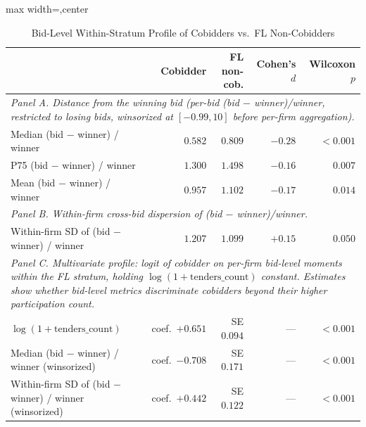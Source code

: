 \begin{table}[htbp]
\centering
\caption{Bid-Level Within-Stratum Profile of Cobidders vs.\ FL Non-Cobidders}
\label{tab:theory_bridge_bidlevel}
\begin{adjustbox}{max width=\textwidth,center}
\begin{threeparttable}
\footnotesize
\begin{tabular}{lrrrr}
\toprule
 & Cobidder & FL non-cob. & Cohen's $d$ & Wilcoxon $p$ \\
\midrule
\multicolumn{5}{l}{\textit{Panel A. Distance from the winning bid (per-bid (bid $-$ winner)/winner, restricted to losing bids, winsorized at $[-0.99, 10]$ before per-firm aggregation).}} \\
Median (bid $-$ winner) / winner & $0.582$ & $0.809$ & $-0.28$ & $<0.001$ \\
P75 (bid $-$ winner) / winner & $1.300$ & $1.498$ & $-0.16$ & $0.007$ \\
Mean (bid $-$ winner) / winner & $0.957$ & $1.102$ & $-0.17$ & $0.014$ \\
\midrule
\multicolumn{5}{l}{\textit{Panel B. Within-firm cross-bid dispersion of (bid $-$ winner)/winner.}} \\
Within-firm SD of (bid $-$ winner) / winner & $1.207$ & $1.099$ & $+0.15$ & $0.050$ \\
\midrule
\multicolumn{5}{l}{\textit{Panel C. Multivariate profile: logit of cobidder on per-firm bid-level moments within the FL stratum, holding $\log(1+\text{tenders\_count})$ constant. Estimates show whether bid-level metrics discriminate cobidders beyond their higher participation count.}} \\
$\log(1+\text{tenders\_count})$ & coef.\ $+0.651$ & SE $0.094$ & --- & $<0.001$ \\
Median (bid $-$ winner) / winner (winsorized) & coef.\ $-0.708$ & SE $0.171$ & --- & $<0.001$ \\
Within-firm SD of (bid $-$ winner) / winner (winsorized) & coef.\ $+0.442$ & SE $0.122$ & --- & $<0.001$ \\
\bottomrule
\end{tabular}
\begin{tablenotes}
\footnotesize

\end{tablenotes}
\end{threeparttable}
\end{adjustbox}
\end{table}
